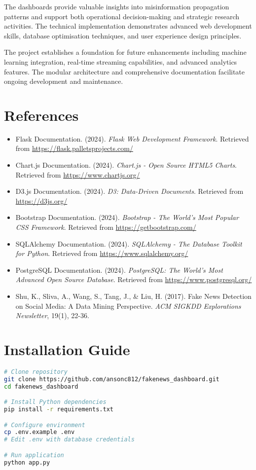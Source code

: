 \documentclass[12pt,a4paper]{article}
\begin{document}
The dashboards provide valuable insights into misinformation propagation patterns and support both operational decision-making and strategic research activities. The technical implementation demonstrates advanced web development skills, database optimisation techniques, and user experience design principles.

The project establishes a foundation for future enhancements including machine learning integration, real-time streaming capabilities, and advanced analytics features. The modular architecture and comprehensive documentation facilitate ongoing development and maintenance.

\section{References}

\begin{itemize}
    \item Flask Documentation. (2024). \textit{Flask Web Development Framework}. Retrieved from \url{https://flask.palletsprojects.com/}
    \item Chart.js Documentation. (2024). \textit{Chart.js - Open Source HTML5 Charts}. Retrieved from \url{https://www.chartjs.org/}
    \item D3.js Documentation. (2024). \textit{D3: Data-Driven Documents}. Retrieved from \url{https://d3js.org/}
    \item Bootstrap Documentation. (2024). \textit{Bootstrap - The World's Most Popular CSS Framework}. Retrieved from \url{https://getbootstrap.com/}
    \item SQLAlchemy Documentation. (2024). \textit{SQLAlchemy - The Database Toolkit for Python}. Retrieved from \url{https://www.sqlalchemy.org/}
    \item PostgreSQL Documentation. (2024). \textit{PostgreSQL: The World's Most Advanced Open Source Database}. Retrieved from \url{https://www.postgresql.org/}
    \item Shu, K., Sliva, A., Wang, S., Tang, J., \& Liu, H. (2017). Fake News Detection on Social Media: A Data Mining Perspective. \textit{ACM SIGKDD Explorations Newsletter}, 19(1), 22-36.
\end{itemize}

\appendix

\section{Installation Guide}
\begin{lstlisting}[language=bash, caption=Installation Commands]
# Clone repository
git clone https://github.com/ansonc812/fakenews_dashboard.git
cd fakenews_dashboard

# Install Python dependencies
pip install -r requirements.txt

# Configure environment
cp .env.example .env
# Edit .env with database credentials

# Run application
python app.py
\end{lstlisting}
\end{document}

